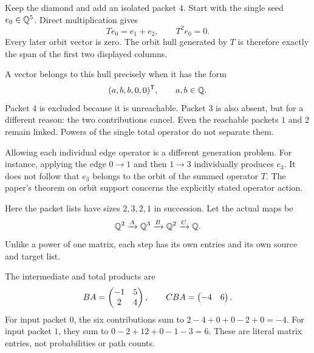 Keep the diamond and add an isolated packet $4$. Start with the single seed $e_0\in\mathbb Q^5$. Direct multiplication gives
\[
Te_0=e_1+e_2,\qquad T^2e_0=0.
\]
Every later orbit vector is zero. The orbit hull generated by $T$ is therefore exactly the span of the first two displayed columns.


A vector belongs to this hull precisely when it has the form
\[
(a,b,b,0,0)^\mathsf T,\qquad a,b\in\mathbb Q.
\]
Packet $4$ is excluded because it is unreachable. Packet $3$ is also absent, but for a different reason: the two contributions cancel. Even the reachable packets $1$ and $2$ remain linked. Powers of the single total operator do not separate them.

Allowing each individual edge operator is a different generation problem. For instance, applying the edge $0\to1$ and then $1\to3$ individually produces $e_3$. It does not follow that $e_3$ belongs to the orbit of the summed operator $T$. The paper's theorem on orbit support concerns the explicitly stated operator action.


Here the packet lists have sizes $2,3,2,1$ in succession. Let the actual maps be
\[
\mathbb Q^2\xrightarrow{A}\mathbb Q^3\xrightarrow{B}\mathbb Q^2\xrightarrow{C}\mathbb Q.
\]
Unlike a power of one matrix, each step has its own entries and its own source and target list.


The intermediate and total products are
\[
BA=\begin{pmatrix}-1&5\\2&4\end{pmatrix},\qquad CBA=\begin{pmatrix}-4&6\end{pmatrix}.
\]
For input packet $0$, the six contributions sum to $2-4+0+0-2+0=-4$. For input packet $1$, they sum to $0-2+12+0-1-3=6$. These are literal matrix entries, not probabilities or path counts.

